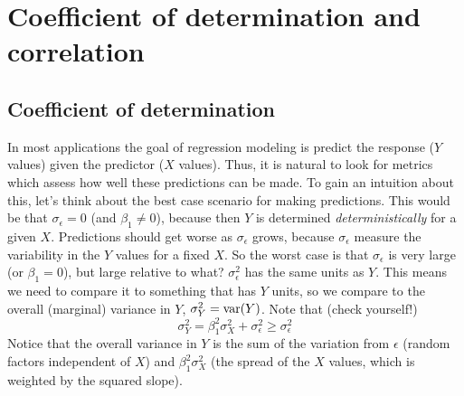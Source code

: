 %
%
%
%
%
%
%



\section{Coefficient of determination and correlation}
\subsection{Coefficient of determination}

In most applications the goal of regression modeling is predict  the response ($Y$ values) given the predictor ($X$ values). Thus, it is natural to look for metrics which assess how well these predictions can be made. To gain an intuition about this, let's think about the best case scenario for making predictions. This would be that $\sigma_{\epsilon}=0$ (and $\beta_1\ne0$), because then $Y$ is determined \emph{deterministically} for a given $X$. Predictions should get worse as $\sigma_{\epsilon}$ grows, because $\sigma_{\epsilon}$ measure the variability in the $Y$ values for a fixed $X$. So the worst case is that $\sigma_{\epsilon}$ is very large (or $\beta_1=0$), but large relative to what? $\sigma_{\epsilon}^2$ has the same units as $Y$. This means we need to compare it to something that has $Y$ units, so we compare to the overall (marginal) variance in $Y$, $\sigma_Y^2 = {\rm var}(Y)$. Note that (check yourself!)
\begin{equation}
\sigma_Y^2 = \beta_1^2\sigma_X^2 + \sigma_{\epsilon}^2 \ge  \sigma_{\epsilon}^2
\end{equation}
Notice that the overall variance in $Y$ is the sum of the variation from $\epsilon$ (random factors independent of $X$) and $\beta_1^2\sigma_X^2$ (the spread of the $X$ values, which is weighted by the squared slope). 

